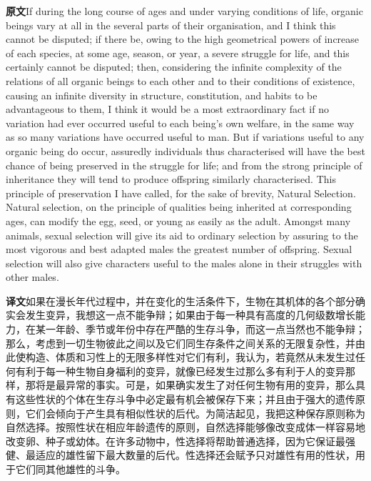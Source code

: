 \documentclass[UTF8,zihao=-4]{ctexart}
\newcommand{\BodyFont}{\fontsize{10.5pt}{15.5pt}\selectfont}
\newcommand{\origlabel}{\textbf{原文}\quad}
\newcommand{\translabel}{\textbf{译文}\quad}
\newenvironment{enblock}{\par\noindent\begingroup\BodyFont\origlabel}{\par\endgroup}
\newenvironment{zhblock}{\par\noindent\begingroup\BodyFont\translabel}{\par\endgroup\vspace{0.35em}}
\newcommand{\pair}[2]{\begin{enblock}#1\end{enblock}\begin{zhblock}#2\end{zhblock}}
\begin{document}
\pair{If during the long course of ages and under varying conditions of life, organic beings vary at all in the several parts of their organisation, and I think this cannot be disputed; if there be, owing to the high geometrical powers of increase of each species, at some age, season, or year, a severe struggle for life, and this certainly cannot be disputed; then, considering the infinite complexity of the relations of all organic beings to each other and to their conditions of existence, causing an infinite diversity in structure, constitution, and habits to be advantageous to them, I think it would be a most extraordinary fact if no variation had ever occurred useful to each being's own welfare, in the same way as so many variations have occurred useful to man. But if variations useful to any organic being do occur, assuredly individuals thus characterised will have the best chance of being preserved in the struggle for life; and from the strong principle of inheritance they will tend to produce offspring similarly characterised. This principle of preservation I have called, for the sake of brevity, Natural Selection. Natural selection, on the principle of qualities being inherited at corresponding ages, can modify the egg, seed, or young as easily as the adult. Amongst many animals, sexual selection will give its aid to ordinary selection by assuring to the most vigorous and best adapted males the greatest number of offspring. Sexual selection will also give characters useful to the males alone in their struggles with other males.}{如果在漫长年代过程中，并在变化的生活条件下，生物在其机体的各个部分确实会发生变异，我想这一点不能争辩；如果由于每一种具有高度的几何级数增长能力，在某一年龄、季节或年份中存在严酷的生存斗争，而这一点当然也不能争辩；那么，考虑到一切生物彼此之间以及它们同生存条件之间关系的无限复杂性，并由此使构造、体质和习性上的无限多样性对它们有利，我认为，若竟然从未发生过任何有利于每一种生物自身福利的变异，就像已经发生过那么多有利于人的变异那样，那将是最异常的事实。可是，如果确实发生了对任何生物有用的变异，那么具有这些性状的个体在生存斗争中必定最有机会被保存下来；并且由于强大的遗传原则，它们会倾向于产生具有相似性状的后代。为简洁起见，我把这种保存原则称为自然选择。按照性状在相应年龄遗传的原则，自然选择能够像改变成体一样容易地改变卵、种子或幼体。在许多动物中，性选择将帮助普通选择，因为它保证最强健、最适应的雄性留下最大数量的后代。性选择还会赋予只对雄性有用的性状，用于它们同其他雄性的斗争。}
\end{document}
